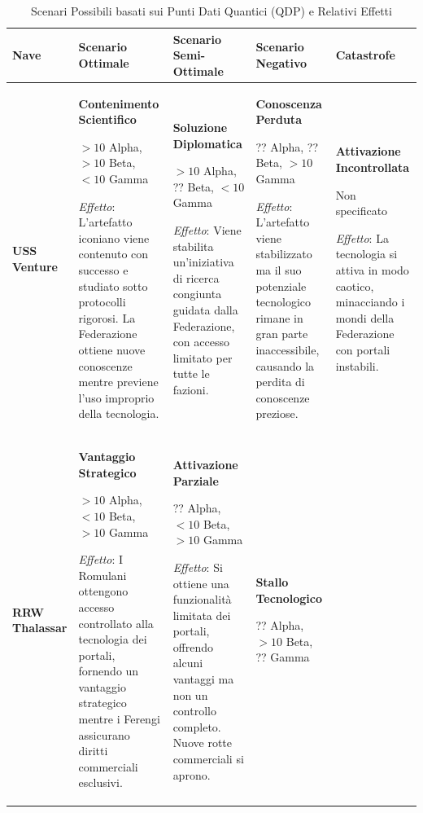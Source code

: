 \documentclass[letterpaper,twocolumn,openany,nodeprecatedcode]{dndbook}
\begin{document}
\begin{landscape}

\begin{table}[htbp]
\centering
\caption{Scenari Possibili basati sui Punti Dati Quantici (QDP) e Relativi Effetti}
\small
\begin{tabular}{|p{2.3cm}|p{4cm}|p{4cm}|p{4cm}|p{4cm}|}
\hline
\textbf{Nave} & \textbf{Scenario Ottimale} & \textbf{Scenario Semi-Ottimale} & \textbf{Scenario Negativo} & \textbf{Catastrofe} \\ 
\hline
\textbf{USS Venture} & 
\textbf{Contenimento Scientifico}

$>10$ Alpha, $>10$ Beta, $<10$ Gamma

\textit{Effetto}: L'artefatto iconiano viene contenuto con successo e studiato sotto protocolli rigorosi. La Federazione ottiene nuove conoscenze mentre previene l'uso improprio della tecnologia.
& 
\textbf{Soluzione Diplomatica}

$>10$ Alpha, ?? Beta, $<10$ Gamma

\textit{Effetto}: Viene stabilita un'iniziativa di ricerca congiunta guidata dalla Federazione, con accesso limitato per tutte le fazioni.
& 
\textbf{Conoscenza Perduta}

?? Alpha, ?? Beta, $>10$ Gamma

\textit{Effetto}: L'artefatto viene stabilizzato ma il suo potenziale tecnologico rimane in gran parte inaccessibile, causando la perdita di conoscenze preziose.
& 
\textbf{Attivazione Incontrollata}

Non specificato

\textit{Effetto}: La tecnologia si attiva in modo caotico, minacciando i mondi della Federazione con portali instabili.
\\ 
\hline
\textbf{RRW Thalassar} & 
\textbf{Vantaggio Strategico}

$>10$ Alpha, $<10$ Beta, $>10$ Gamma

\textit{Effetto}: I Romulani ottengono accesso controllato alla tecnologia dei portali, fornendo un vantaggio strategico mentre i Ferengi assicurano diritti commerciali esclusivi.
& 
\textbf{Attivazione Parziale}

?? Alpha, $<10$ Beta, $>10$ Gamma

\textit{Effetto}: Si ottiene una funzionalità limitata dei portali, offrendo alcuni vantaggi ma non un controllo completo. Nuove rotte commerciali si aprono.
& 
\textbf{Stallo Tecnologico}

?? Alpha, $>10$ Beta, ?? Gamma


\end{tabular}
\end{table}
\end{landscape}
\end{document}

